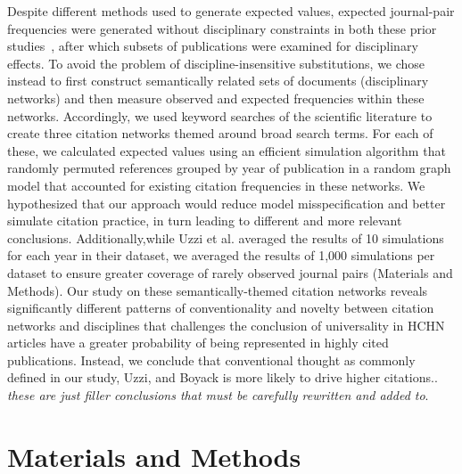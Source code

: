 \documentclass[NETN]{stjour}
\begin{document}
Despite different methods used to generate expected values, expected journal-pair frequencies were generated without disciplinary constraints in both these prior studies~\citep{uzzi_atypical_2013,boyack_vs_uzzi_2014}, after which subsets of publications were examined for disciplinary effects. To avoid the problem of discipline-insensitive substitutions, we chose instead to first construct semantically related sets of documents (disciplinary networks) and then measure observed and expected frequencies within these networks. Accordingly, we used keyword searches of the scientific literature to create three citation networks themed around broad search terms. For each of these, we calculated expected values using an efficient simulation algorithm that randomly permuted references grouped by year of publication in a random graph model that accounted for existing citation frequencies in these networks. We hypothesized that our approach would  reduce model misspecification and better simulate citation practice, in turn leading to different and more relevant conclusions. Additionally,while Uzzi et al. averaged the results of 10 simulations for each year in their dataset, we averaged the results of 1,000 simulations per dataset to ensure greater coverage of rarely observed journal pairs (Materials and Methods). Our study on these semantically-themed citation networks reveals significantly different patterns of conventionality and novelty between  citation networks and disciplines that challenges the conclusion of universality in HCHN articles have a greater probability of being represented in highly cited publications. Instead, we conclude that conventional thought as commonly defined in our study, Uzzi, and Boyack is more likely to drive higher citations.. \emph{these are just filler conclusions that must be carefully rewritten and added to}.

\section{Materials and Methods}
\end{document}
